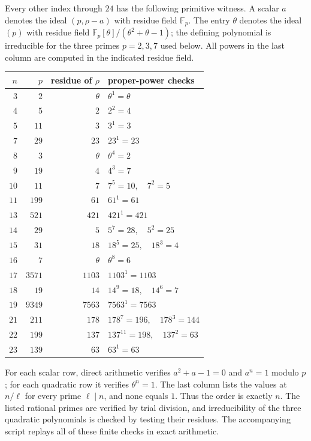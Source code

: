 Every other index through $24$ has the following primitive witness.
A scalar $a$ denotes the ideal $(p,\rho-a)$ with residue field
$\mathbb F_p$.  The entry $\theta$ denotes the ideal $(p)$ with
residue field
$\mathbb F_p[\theta]/(\theta^2+\theta-1)$; the defining polynomial
is irreducible for the three primes $p=2,3,7$ used below.
All powers in the last column are computed in the indicated residue
field.

\begin{center}
\small
\begin{tabular}{r|r|r|l}
$n$ & $p$ & residue of $\rho$ & proper-power checks\\ \hline
$3$ & $2$ & $\theta$ & $\theta^1=\theta$\\
$4$ & $5$ & $2$ & $2^2=4$\\
$5$ & $11$ & $3$ & $3^1=3$\\
$7$ & $29$ & $23$ & $23^1=23$\\
$8$ & $3$ & $\theta$ & $\theta^4=2$\\
$9$ & $19$ & $4$ & $4^3=7$\\
$10$ & $11$ & $7$ & $7^5=10,\quad 7^2=5$\\
$11$ & $199$ & $61$ & $61^1=61$\\
$13$ & $521$ & $421$ & $421^1=421$\\
$14$ & $29$ & $5$ & $5^7=28,\quad5^2=25$\\
$15$ & $31$ & $18$ & $18^5=25,\quad18^3=4$\\
$16$ & $7$ & $\theta$ & $\theta^8=6$\\
$17$ & $3571$ & $1103$ & $1103^1=1103$\\
$18$ & $19$ & $14$ & $14^9=18,\quad14^6=7$\\
$19$ & $9349$ & $7563$ & $7563^1=7563$\\
$21$ & $211$ & $178$ & $178^7=196,\quad178^3=144$\\
$22$ & $199$ & $137$ & $137^{11}=198,\quad137^2=63$\\
$23$ & $139$ & $63$ & $63^1=63$
\end{tabular}
\end{center}

For each scalar row, direct arithmetic verifies
$a^2+a-1=0$ and $a^n=1$ modulo $p$; for each quadratic row it
verifies $\theta^n=1$.  The last column lists the values at $n/\ell$
for every prime $\ell\mid n$, and none equals $1$.
Thus the order is exactly $n$.  The listed rational primes are
verified by trial division, and irreducibility of the three quadratic
polynomials is checked by testing their residues.  The accompanying
script replays all of these finite checks in exact arithmetic.

